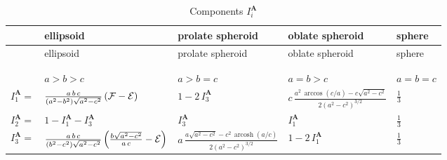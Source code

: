 \documentclass[
  a4paper,
  numbers=noendperiod,
  DIV=12]{scrreprt}
\newcommand{\uu}[1]{{\symbf{{#1}}}}
\DeclareMathOperator{\arcosh}{arcosh}
\begin{document}
\begin{longtable}[]{@{}
  >{\raggedright\arraybackslash}p{}
  >{\raggedright\arraybackslash}p{}
  >{\raggedright\arraybackslash}p{}
  >{\raggedright\arraybackslash}p{}
  >{\raggedright\arraybackslash}p{}@{}}
\toprule\noalign{}
\begin{minipage}[b]{\linewidth}\raggedright
\end{minipage} & \begin{minipage}[b]{\linewidth}\raggedright
ellipsoid
\end{minipage} & \begin{minipage}[b]{\linewidth}\raggedright
prolate spheroid
\end{minipage} & \begin{minipage}[b]{\linewidth}\raggedright
oblate spheroid
\end{minipage} & \begin{minipage}[b]{\linewidth}\raggedright
sphere
\end{minipage} \\
\midrule\noalign{}
\endfirsthead
\toprule\noalign{}
\begin{minipage}[b]{\linewidth}\raggedright
\end{minipage} & \begin{minipage}[b]{\linewidth}\raggedright
ellipsoid
\end{minipage} & \begin{minipage}[b]{\linewidth}\raggedright
prolate spheroid
\end{minipage} & \begin{minipage}[b]{\linewidth}\raggedright
oblate spheroid
\end{minipage} & \begin{minipage}[b]{\linewidth}\raggedright
sphere
\end{minipage} \\
\midrule\noalign{}
\endhead
\bottomrule\noalign{}
\tabularnewline
\caption{Components \(I^{\uu{A}}_i\)}\label{tbl-Ii}\tabularnewline
\endlastfoot
& \(a>b>c\) & \(a>b=c\) & \(a=b>c\) & \(a=b=c\) \\
\(I^{\uu{A}}_1 =\) &
\(\frac{a\,b\,c}{(a^2-b^2)\sqrt{a^2-c^2}}\left({\cal F}-{\cal E}\right)\)
& \(1-2\,I^{\uu{A}}_3\) &
\(c\,\frac{a^2\,\arccos{(c/a)}-c\sqrt{a^2-c^2}}{2\left(a^2-c^2\right)^{3/2}}\)
& \(\frac{1}{3}\) \\
\(I^{\uu{A}}_2 =\) & \(1-I^{\uu{A}}_1-I^{\uu{A}}_3\) & \(I^{\uu{A}}_3\)
& \(I^{\uu{A}}_1\) & \(\frac{1}{3}\) \\
\(I^{\uu{A}}_3 =\) &
\(\frac{a\,b\,c}{(b^2-c^2)\sqrt{a^2-c^2}}\left(\frac{b\sqrt{a^2-c^2}}{a\,c}-{\cal E}\right)\)
&
\(a\,\frac{a\sqrt{a^2-c^2}-c^2\,\arcosh{(a/c)}}{2\left(a^2-c^2\right)^{3/2}}\)
& \(1-2\,I^{\uu{A}}_1\) & \(\frac{1}{3}\) \\
\end{longtable}
\end{document}

